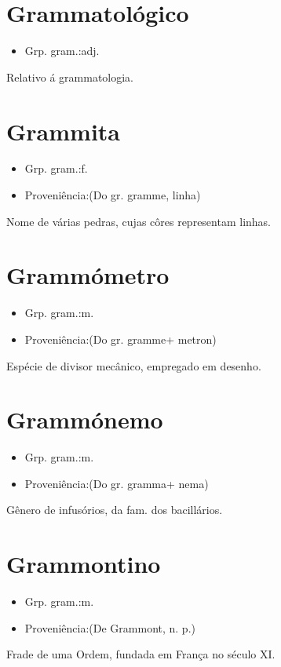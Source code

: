 \section{Grammatológico}
\begin{itemize}
\item {Grp. gram.:adj.}
\end{itemize}
Relativo á grammatologia.
\section{Grammita}
\begin{itemize}
\item {Grp. gram.:f.}
\end{itemize}
\begin{itemize}
\item {Proveniência:(Do gr. \textunderscore gramme\textunderscore , linha)}
\end{itemize}
Nome de várias pedras, cujas côres representam linhas.
\section{Grammómetro}
\begin{itemize}
\item {Grp. gram.:m.}
\end{itemize}
\begin{itemize}
\item {Proveniência:(Do gr. \textunderscore gramme\textunderscore  + \textunderscore metron\textunderscore )}
\end{itemize}
Espécie de divisor mecânico, empregado em desenho.
\section{Grammónemo}
\begin{itemize}
\item {Grp. gram.:m.}
\end{itemize}
\begin{itemize}
\item {Proveniência:(Do gr. \textunderscore gramma\textunderscore  + \textunderscore nema\textunderscore )}
\end{itemize}
Gênero de infusórios, da fam. dos bacillários.
\section{Grammontino}
\begin{itemize}
\item {Grp. gram.:m.}
\end{itemize}
\begin{itemize}
\item {Proveniência:(De \textunderscore Grammont\textunderscore , n. p.)}
\end{itemize}
Frade de uma Ordem, fundada em França no século XI.

